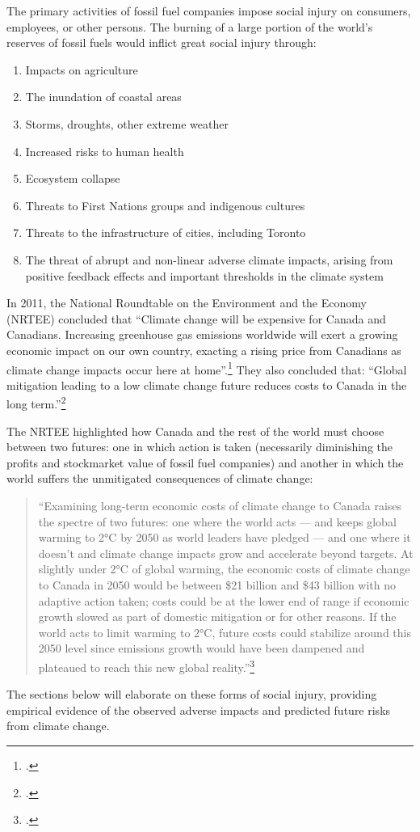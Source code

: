 The primary activities of fossil fuel companies impose social injury on consumers, employees, or other persons.
The burning of a large portion of the world's reserves of fossil fuels would inflict great social injury through:
\begin{enumerate}
\item Impacts on agriculture
\item The inundation of coastal areas
\item Storms, droughts, other extreme weather
\item Increased risks to human health
\item Ecosystem collapse 
\item Threats to First Nations groups and indigenous cultures
\item Threats to the infrastructure of cities, including Toronto
\item The threat of abrupt and non-linear adverse climate impacts, arising from positive feedback effects and important thresholds in the climate system
\end{enumerate}
In 2011, the National Roundtable on the Environment and the Economy (NRTEE) concluded that ``Climate change will be expensive for Canada and Canadians. Increasing greenhouse gas emissions worldwide will exert a growing economic impact on our own country, exacting a rising price from Canadians as climate change impacts occur here at home''.\footcite[][p.15]{NRTEEPrice}
They also concluded that: ``Global mitigation leading to a low climate change future reduces costs to Canada in the long term.''\footcite[][p.16]{NRTEEPrice}



The NRTEE highlighted how Canada and the rest of the world must choose between two futures: one in which action is taken (necessarily diminishing the profits and stockmarket value of fossil fuel companies) and another in which the world suffers the unmitigated consequences of climate change:
\begin{quote}
``Examining long-term economic costs of climate change to Canada raises the spectre of two futures: one where the world acts — and keeps global warming to 2°C by 2050 as world leaders have pledged — and one where it doesn't and climate change impacts grow and accelerate beyond targets. At slightly under 2°C of global warming, the economic costs of climate change to Canada in 2050 would be between \$21 billion and \$43 billion with no adaptive action taken; costs could be at the lower end of range if economic growth slowed as part of domestic mitigation or for other reasons. If the world acts to limit warming to 2°C, future costs could stabilize around this 2050 level since emissions growth would have been dampened and plateaued to reach this new global reality.''\footcite[][p.18]{NRTEEPrice}
\end{quote}
The sections below will elaborate on these forms of social injury, providing empirical evidence of the observed adverse impacts and predicted future risks from climate change.




